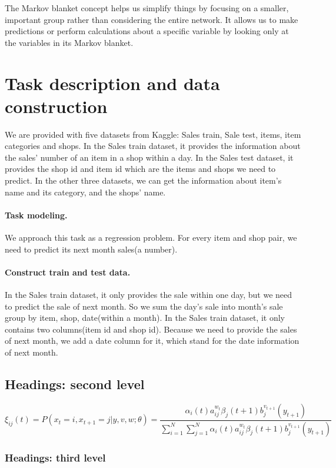 \documentclass{article}
\begin{document}
The Markov blanket concept helps us simplify things by focusing on a smaller, important group rather than considering the entire network. It allows us to make predictions or perform calculations about a specific variable by looking only at the variables in its Markov blanket.


\section{Task description and data construction}
\label{sec:headings}
We are provided with five datasets from Kaggle: Sales train, Sale test, items, item categories and shops. In the Sales train dataset, it provides the information about the sales’ number of an item in a shop within a day. In the Sales test dataset, it provides the shop id and item id which are the items and shops we need to predict. In the other three datasets, we can get the information about item’s name and its category, and the shops’ name.
\paragraph{Task modeling.}
We approach this task as a regression problem. For every item and shop pair, we need to predict its next month sales(a number).
\paragraph{Construct train and test data.}
In the Sales train dataset, it only provides the sale within one day, but we need to predict the sale of next month. So we sum the day's sale into month's sale group by item, shop, date(within a month).
In the Sales train dataset, it only contains two columns(item id and shop id). Because we need to provide the sales of next month, we add a date column for it, which stand for the date information of next month.

\subsection{Headings: second level}
\lipsum[5]
\begin{equation}
\xi _{ij}(t)=P(x_{t}=i,x_{t+1}=j|y,v,w;\theta)= {\frac {\alpha _{i}(t)a^{w_t}_{ij}\beta _{j}(t+1)b^{v_{t+1}}_{j}(y_{t+1})}{\sum _{i=1}^{N} \sum _{j=1}^{N} \alpha _{i}(t)a^{w_t}_{ij}\beta _{j}(t+1)b^{v_{t+1}}_{j}(y_{t+1})}}
\end{equation}

\subsubsection{Headings: third level}
\lipsum[6]
\end{document}

